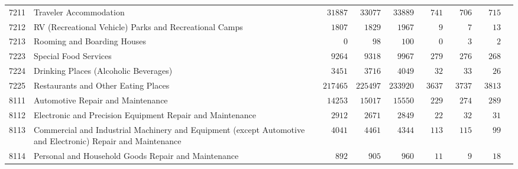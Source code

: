 \documentclass[9pt, oneside]{article}   	%
\begin{document}
\begin{longtable}{lp{3 in}ccccccc}
7211  & Traveler Accommodation & $\phantom{0}31887$ & $\phantom{0}33077$ & $\phantom{0}33889$ & $\phantom{00}741$ & $\phantom{00}706$ & $\phantom{00}715$ \\
7212  & RV (Recreational Vehicle) Parks and Recreational Camps & $\phantom{00}1807$ & $\phantom{00}1829$ & $\phantom{00}1967$ & $\phantom{0000}9$ & $\phantom{0000}7$ & $\phantom{000}13$ \\
7213  & Rooming and Boarding Houses & $\phantom{00000}0$ & $\phantom{0000}98$ & $\phantom{000}100$ & $\phantom{0000}0$ & $\phantom{0000}3$ & $\phantom{0000}2$ \\

7223  & Special Food Services & $\phantom{00}9264$ & $\phantom{00}9318$ & $\phantom{00}9967$ & $\phantom{00}279$ & $\phantom{00}276$ & $\phantom{00}268$ \\
7224  & Drinking Places (Alcoholic Beverages) & $\phantom{00}3451$ & $\phantom{00}3716$ & $\phantom{00}4049$ & $\phantom{000}32$ & $\phantom{000}33$ & $\phantom{000}26$ \\
7225  & Restaurants and Other Eating Places & $217465$ & $225497$ & $233920$ & $\phantom{0}3637$ & $\phantom{0}3737$ & $\phantom{0}3813$ \\
8111  & Automotive Repair and Maintenance & $\phantom{0}14253$ & $\phantom{0}15017$ & $\phantom{0}15550$ & $\phantom{00}229$ & $\phantom{00}274$ & $\phantom{00}289$ \\
8112  & Electronic and Precision Equipment Repair and Maintenance & $\phantom{00}2912$ & $\phantom{00}2671$ & $\phantom{00}2849$ & $\phantom{000}22$ & $\phantom{000}32$ & $\phantom{000}31$ \\
8113  & Commercial and Industrial Machinery and Equipment (except Automotive and Electronic) Repair and Maintenance & $\phantom{00}4041$ & $\phantom{00}4461$ & $\phantom{00}4344$ & $\phantom{00}113$ & $\phantom{00}115$ & $\phantom{000}99$ \\
8114  & Personal and Household Goods Repair and Maintenance & $\phantom{000}892$ & $\phantom{000}905$ & $\phantom{000}960$ & $\phantom{000}11$ & $\phantom{0000}9$ & $\phantom{000}18$ \\


\end{longtable}
\end{document}
